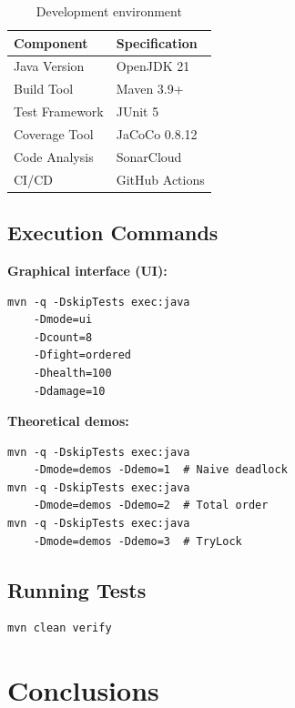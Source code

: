 \documentclass[10pt,a4paper,twocolumn]{article}
\begin{document}
\begin{table}[H]
    \centering
    \begin{tabular}{|l|l|}
        \hline
        \textbf{Component} & \textbf{Specification} \\
        \hline
        Java Version & OpenJDK 21 \\
        \hline
        Build Tool & Maven 3.9+ \\
        \hline
        Test Framework & JUnit 5 \\
        \hline
        Coverage Tool & JaCoCo 0.8.12 \\
        \hline
        Code Analysis & SonarCloud \\
        \hline
        CI/CD & GitHub Actions \\
        \hline
    \end{tabular}
    \caption{Development environment}
    \label{tab:env}
\end{table}

\subsection{Execution Commands}

\textbf{Graphical interface (UI):}
\begin{verbatim}
mvn -q -DskipTests exec:java 
    -Dmode=ui 
    -Dcount=8 
    -Dfight=ordered 
    -Dhealth=100 
    -Ddamage=10
\end{verbatim}

\textbf{Theoretical demos:}
\begin{verbatim}
mvn -q -DskipTests exec:java 
    -Dmode=demos -Ddemo=1  # Naive deadlock
mvn -q -DskipTests exec:java 
    -Dmode=demos -Ddemo=2  # Total order
mvn -q -DskipTests exec:java 
    -Dmode=demos -Ddemo=3  # TryLock
\end{verbatim}

\subsection{Running Tests}

\begin{verbatim}
mvn clean verify
\end{verbatim}

\section{Conclusions}
\end{document}
